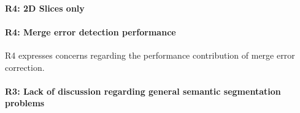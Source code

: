 \documentclass[10pt,twocolumn,letterpaper]{article}
\begin{document}
\paragraph{R4: 2D Slices only}

\paragraph{R4: Merge error detection performance} R4 expresses concerns regarding the performance contribution of merge error correction. 

\paragraph{R3: Lack of discussion regarding general semantic segmentation problems}



%
%
\end{document}
